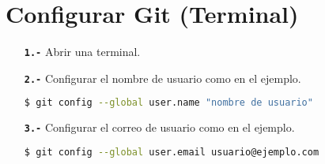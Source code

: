 \section{Configurar Git (Terminal)}
\begin{itemize}
	\item[\textbf{\texttt{1.-}}] Abrir una terminal.
	\item[\textbf{\texttt{2.-}}] Configurar el nombre de usuario como en el ejemplo.
	\begin{lstlisting}[language=bash, caption= Ejemplo. Configuración del nombre]
$ git config --global user.name "nombre de usuario"\end{lstlisting}
	\item[\textbf{\texttt{3.-}}] Configurar el correo de usuario como en el ejemplo.
	\begin{lstlisting}[language=bash, caption= Ejemplo. Configuración del correo]
$ git config --global user.email usuario@ejemplo.com\end{lstlisting}
\end{itemize}
